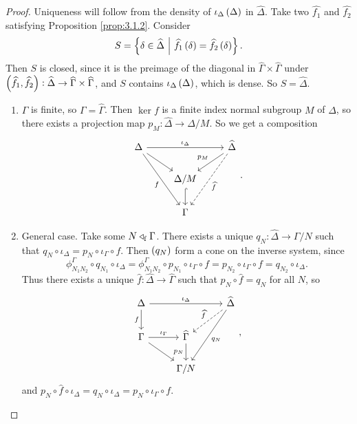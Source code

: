 \begin{proof}
Uniqueness will follow from the density of $ \iota_\Delta\br{\Delta} $ in $ \widehat{\Delta} $. Take two $ \widehat{f_1} $ and $ \widehat{f_2} $ satisfying Proposition \ref{prop:3.1.2}. Consider
$$ S = \cbr{\delta \in \widehat{\Delta} \st \widehat{f_1}\br{\delta} = \widehat{f_2}\br{\delta}}. $$
Then $ S $ is closed, since it is the preimage of the diagonal in $ \widehat{\Gamma} \times \widehat{\Gamma} $ under $ \br{\widehat{f_1}, \widehat{f_2}} : \widehat{\Delta} \to \widehat{\Gamma} \times \widehat{\Gamma} $, and $ S $ contains $ \iota_\Delta\br{\Delta} $, which is dense. So $ S = \widehat{\Delta} $.
\begin{enumerate}[leftmargin=0.5in, label=Case \arabic*.]
\item $ \Gamma $ is finite, so $ \Gamma = \widehat{\Gamma} $. Then $ \ker f $ is a finite index normal subgroup $ M $ of $ \Delta $, so there exists a projection map $ p_M : \widehat{\Delta} \to \Delta / M $. So we get a composition
$$
\begin{tikzcd}
\Delta \arrow{rr}{\iota_\Delta} \arrow{dr} \arrow{ddr}[swap]{f} & & \widehat{\Delta} \arrow{dl}[swap]{p_M} \arrow[dashed]{ddl}{\widehat{f}} \\
& \Delta / M \arrow[hookrightarrow]{d} & \\
& \Gamma &
\end{tikzcd}.
$$
\item General case. Take some $ N \triangleleft_{\mathrm{f}} \Gamma $. There exists a unique $ q_N : \widehat{\Delta} \to \Gamma / N $ such that $ q_N \circ \iota_\Delta = p_N \circ \iota_\Gamma \circ f $. Then $ \br{q_N} $ form a cone on the inverse system, since
$$ \phi_{N_1N_2}^\Gamma \circ q_{N_1} \circ \iota_\Delta = \phi_{N_1N_2}^\Gamma \circ p_{N_1} \circ \iota_\Gamma \circ f = p_{N_2} \circ \iota_\Gamma \circ f = q_{N_2} \circ \iota_\Delta. $$
Thus there exists a unique $ \widehat{f} : \widehat{\Delta} \to \widehat{\Gamma} $ such that $ p_N \circ \widehat{f} = q_N $ for all $ N $, so
$$
\begin{tikzcd}
\Delta \arrow{rr}{\iota_\Delta} \arrow{d}[swap]{f} & & \widehat{\Delta} \arrow[dashed]{dl}[swap]{\widehat{f}} \arrow{ddl}{q_N} \\
\Gamma \arrow{r}{\iota_\Gamma} \arrow{dr} & \widehat{\Gamma} \arrow{d}[swap]{p_N} & \\
& \Gamma / N &
\end{tikzcd},
$$
and $ p_N \circ \widehat{f} \circ \iota_\Delta = q_N \circ \iota_\Delta = p_N \circ \iota_\Gamma \circ f $.
\end{enumerate}
\end{proof}

